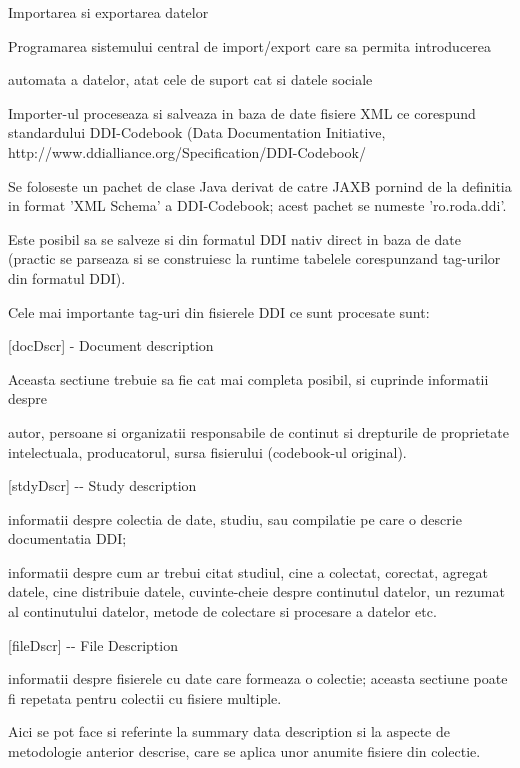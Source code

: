 \documentclass{article}
\title{}
\begin{document}
Importarea si exportarea datelor


\bigskip

Programarea sistemului central de import/export care sa permita introducerea

automata a datelor, atat cele de suport cat si datele sociale


\bigskip

Importer-ul proceseaza si salveaza in baza de date fisiere XML ce corespund standardului DDI-Codebook (Data Documentation Initiative, http://www.ddialliance.org/Specification/DDI-Codebook/


\bigskip

Se foloseste un pachet de clase Java derivat de catre JAXB pornind de la definitia in format 'XML Schema' a DDI-Codebook; acest pachet se numeste 'ro.roda.ddi'.

Este posibil sa se salveze si din formatul DDI nativ direct in baza de date (practic se parseaza si se construiesc la runtime tabelele corespunzand tag-urilor din formatul DDI).


\bigskip

Cele mai importante tag-uri din fisierele DDI ce sunt procesate sunt:


\bigskip

[docDscr] - Document description

Aceasta sectiune trebuie sa fie cat mai completa posibil, si cuprinde informatii despre

autor, persoane si organizatii responsabile de continut si drepturile de proprietate intelectuala, producatorul, sursa fisierului (codebook-ul original).


\bigskip

[stdyDscr] -{}- Study description

informatii despre colectia de date, studiu, sau compilatie pe care o descrie documentatia DDI;

informatii despre cum ar trebui citat studiul, cine a colectat, corectat, agregat datele, cine distribuie datele, cuvinte-cheie despre continutul datelor, un rezumat al continutului datelor, metode de colectare si procesare a datelor etc.


\bigskip

[fileDscr] -{}- File Description

informatii despre fisierele cu date care formeaza o colectie; aceasta sectiune poate fi repetata pentru colectii cu fisiere multiple.

Aici se pot face si referinte la {\textquotedbl}summary data description{\textquotedbl} si la aspecte de metodologie anterior descrise, care se aplica unor anumite fisiere din colectie.
\end{document}
